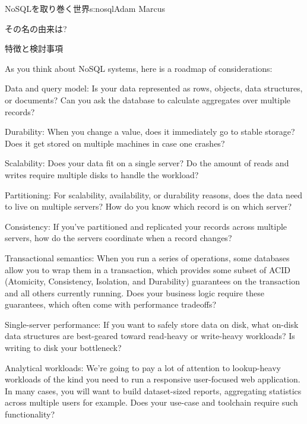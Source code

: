 \begin{aosachapter}{NoSQLを取り巻く世界}{s:nosql}{Adam Marcus}
\begin{aosasect1}{その名の由来は?}
\begin{aosasect2}{特徴と検討事項}
\pagebreak

\noindent As you think about NoSQL systems, here is a roadmap of considerations:

\begin{aosadescription}

  \item{Data and query model}: Is your data represented as rows,
  objects, data structures, or documents? Can you ask the database to
  calculate aggregates over multiple records?

  \item{Durability}: When you change a value, does it immediately
  go to stable storage?  Does it get stored on multiple machines in
  case one crashes?

  \item{Scalability}: Does your data fit on a single server?  Do
  the amount of reads and writes require multiple disks to handle the
  workload?

  \item{Partitioning}: For scalability, availability, or
  durability reasons, does the data need to live on multiple servers?
  How do you know which record is on which server?

  \item{Consistency}: If you've partitioned and replicated your
  records across multiple servers, how do the servers coordinate when
  a record changes?

  \item{Transactional semantics}: When you run a series of
  operations, some databases allow you to wrap them in a transaction,
  which provides some subset of ACID (Atomicity, Consistency,
  Isolation, and Durability) guarantees on the transaction and all
  others currently running.  Does your business logic require these
  guarantees, which often come with performance tradeoffs?

  \item{Single-server performance}: If you want to safely store
  data on disk, what on-disk data structures are best-geared toward
  read-heavy or write-heavy workloads? Is writing to disk your
  bottleneck?

  \item{Analytical workloads}: We're going to pay a lot of
  attention to lookup-heavy workloads of the kind you need to run a
  responsive user-focused web application.  In many cases, you will
  want to build dataset-sized reports, aggregating statistics across
  multiple users for example.  Does your use-case and toolchain
  require such functionality?


\end{aosadescription}
\end{aosasect2}
\end{aosasect1}
\end{aosachapter}
